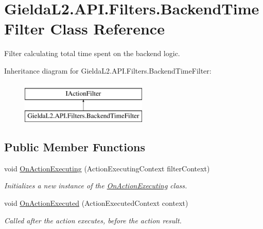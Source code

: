 \hypertarget{class_gielda_l2_1_1_a_p_i_1_1_filters_1_1_backend_time_filter}{}\section{Gielda\+L2.\+A\+P\+I.\+Filters.\+Backend\+Time\+Filter Class Reference}
\label{class_gielda_l2_1_1_a_p_i_1_1_filters_1_1_backend_time_filter}


Filter calculating total time spent on the backend logic.  


Inheritance diagram for Gielda\+L2.\+A\+P\+I.\+Filters.\+Backend\+Time\+Filter\+:\begin{figure}[H]
\begin{center}
\leavevmode
\includegraphics[height=2.000000cm]{class_gielda_l2_1_1_a_p_i_1_1_filters_1_1_backend_time_filter}
\end{center}
\end{figure}
\subsection*{Public Member Functions}
\begin{DoxyCompactItemize}
\item 
void \mbox{\hyperlink{class_gielda_l2_1_1_a_p_i_1_1_filters_1_1_backend_time_filter_a574dadcdcdbee12457c072577873497b}{On\+Action\+Executing}} (Action\+Executing\+Context filter\+Context)
\begin{DoxyCompactList}\small\item\em Initializes a new instance of the \mbox{\hyperlink{class_gielda_l2_1_1_a_p_i_1_1_filters_1_1_backend_time_filter_a574dadcdcdbee12457c072577873497b}{On\+Action\+Executing}} class. \end{DoxyCompactList}\item 
void \mbox{\hyperlink{class_gielda_l2_1_1_a_p_i_1_1_filters_1_1_backend_time_filter_a5764fd9d5044d1853faff5c8e002203f}{On\+Action\+Executed}} (Action\+Executed\+Context context)
\begin{DoxyCompactList}\small\item\em Called after the action executes, before the action result. \end{DoxyCompactList}\end{DoxyCompactItemize}


